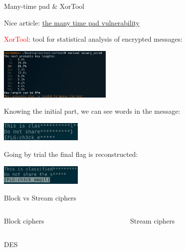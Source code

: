 \begin{frame}{Many-time pad \& XorTool}

  Nice article: 
  \textcolor{red}{\href{http://www.thecrowned.org/the-one-time-pad-and-the-many-time-pad-vulnerability}{the many time pad vulnerability}}

  \smallskip
  
  \textcolor{red}{XorTool}: tool for statistical analysis of encrypted messages:

  \centerline{\includegraphics[width=5.5cm]{img/xortool}}

  \smallskip
  Knowing the initial part, we can see words in the message:
   
  \centerline{\includegraphics[width=4cm]{img/xor1}}

  Going by trial the final flag is reconstructed:
    
  \centerline{\includegraphics[width=4cm]{img/xor2}}


\end{frame}

\begin{frame}{Block vs Stream ciphers}

  \begin{columns}
  \begin{column}{0.5\textwidth}
    Block ciphers
  \end{column}
  \begin{column}{0.5\textwidth}
    Stream ciphers
  \end{column}
  \end{columns}

\end{frame}

\begin{frame}{DES}

\end{frame}

